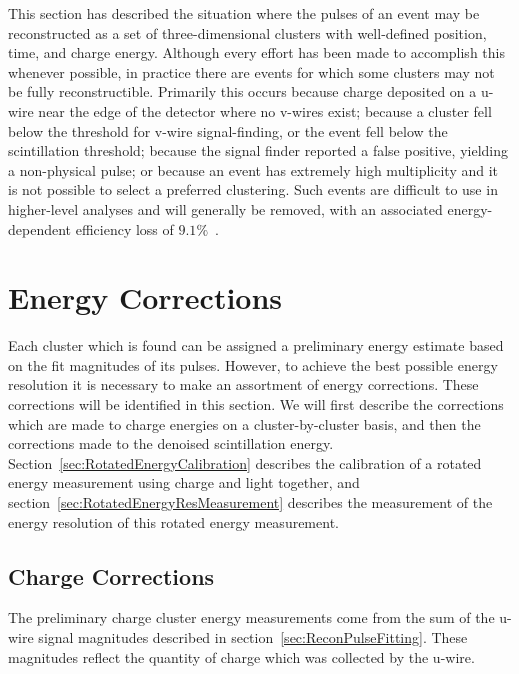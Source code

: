 This section has described the situation where the pulses of an event may be reconstructed as a set of three-dimensional clusters with well-defined position, time, and charge energy.  Although every effort has been made to accomplish this whenever possible, in practice there are events for which some clusters may not be fully reconstructible.  Primarily this occurs because charge deposited on a u-wire near the edge of the detector where no v-wires exist; because a cluster fell below the threshold for v-wire signal-finding, or the event fell below the scintillation threshold; because the signal finder reported a false positive, yielding a non-physical pulse; or because an event has extremely high multiplicity and it is not possible to select a preferred clustering.  Such events are difficult to use in higher-level analyses and will generally be removed, with an associated energy-dependent efficiency loss of $9.1\%$~\cite{NewEXObb0nPaper_2014}.

\section{Energy Corrections}\label{sec:ResultEnergy}

Each cluster which is found can be assigned a preliminary energy estimate based on the fit magnitudes of its pulses.  However, to achieve the best possible energy resolution it is necessary to make an assortment of energy corrections.  These corrections will be identified in this section.  We will first describe the corrections which are made to charge energies on a cluster-by-cluster basis, and then the corrections made to the denoised scintillation energy.  Section~\ref{sec:RotatedEnergyCalibration} describes the calibration of a rotated energy measurement using charge and light together, and section~\ref{sec:RotatedEnergyResMeasurement} describes the measurement of the energy resolution of this rotated energy measurement.

\subsection{Charge Corrections}\label{sec:ResultEnergyCharge}

The preliminary charge cluster energy measurements come from the sum of the u-wire signal magnitudes described in section~\ref{sec:ReconPulseFitting}.  These magnitudes reflect the quantity of charge which was collected by the u-wire.

